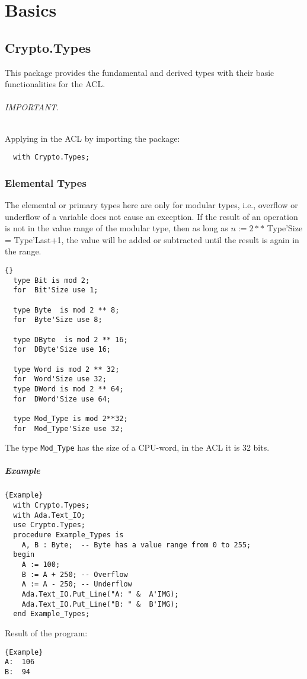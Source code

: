 \part{Basics}
\chapter{Crypto.Types}
This package provides the fundamental and derived types with their
basic functionalities for the ACL.

\paragraph{IMPORTANT.} Applying in the ACL by importing the package:
\begin{lstlisting}
  with Crypto.Types;
\end{lstlisting}
\section{Elemental Types}
The elemental or primary types here are only for modular types, i.e.,
overflow or underflow of a variable does not cause an exception. If
the result of an operation is not in the value range of the modular
type, then as long as $n:=2**$ Type'Size = Type'Last+1, the value will
be added or subtracted until the result is again in the range.
\begin{lstlisting}{}
  type Bit is mod 2;
  for  Bit'Size use 1;

  type Byte  is mod 2 ** 8;
  for  Byte'Size use 8;

  type DByte  is mod 2 ** 16;
  for  DByte'Size use 16;

  type Word is mod 2 ** 32;
  for  Word'Size use 32;
  type DWord is mod 2 ** 64;
  for  DWord'Size use 64;

  type Mod_Type is mod 2**32;
  for  Mod_Type'Size use 32;
\end{lstlisting}
The type \texttt{Mod\_Type} has the size of a CPU-word, in the ACL it
is 32 bits.

\subsubsection*{Example}
\begin{lstlisting}{Example}
  with Crypto.Types;
  with Ada.Text_IO;
  use Crypto.Types;
  procedure Example_Types is
    A, B : Byte;  -- Byte has a value range from 0 to 255;
  begin
    A := 100;
    B := A + 250; -- Overflow
    A := A - 250; -- Underflow
    Ada.Text_IO.Put_Line("A: " &  A'IMG);
    Ada.Text_IO.Put_Line("B: " &  B'IMG);
  end Example_Types;
\end{lstlisting}
Result of the program:
\begin{lstlisting}{Example}
A:  106
B:  94
\end{lstlisting}

